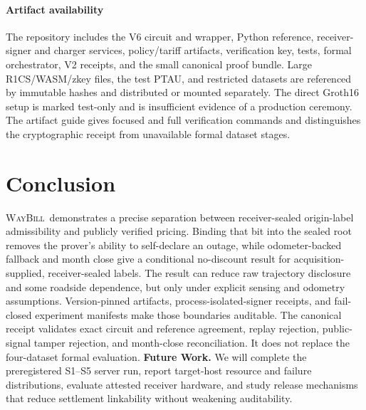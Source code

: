 \documentclass[conference]{IEEEtran}
\theoremstyle{plain}
\theoremstyle{definition}
\newcommand{\system}{\textsc{WayBill}}
\begin{document}
\paragraph{Artifact availability}
The repository includes the V6 circuit and wrapper, Python reference,
receiver-signer and charger services, policy/tariff artifacts, verification
key, tests, formal orchestrator, V2 receipts, and the small canonical proof
bundle. Large R1CS/WASM/zkey files, the test PTAU, and restricted datasets are
referenced by immutable hashes and distributed or mounted separately. The
direct Groth16 setup is marked test-only and is insufficient evidence of a
production ceremony. The artifact guide gives focused and full verification
commands and distinguishes the cryptographic receipt from unavailable formal
dataset stages.

\section{Conclusion}

\system\ demonstrates a precise separation between receiver-sealed
origin-label admissibility and publicly verified pricing. Binding that bit into the sealed root
removes the prover's ability to self-declare an outage, while odometer-backed
fallback and month close give a conditional no-discount result for
acquisition-supplied, receiver-sealed labels. The result can reduce raw trajectory disclosure
and some roadside dependence, but only under explicit sensing and odometry
assumptions. Version-pinned artifacts, process-isolated-signer receipts, and
fail-closed experiment manifests make those boundaries auditable.
The canonical receipt validates exact circuit and reference agreement, replay
rejection, public-signal tamper rejection, and month-close reconciliation. It
does not replace the four-dataset formal evaluation. \textbf{Future Work.} We
will complete the preregistered S1--S5 server run, report target-host resource
and failure distributions, evaluate attested receiver hardware, and study
release mechanisms that reduce settlement linkability without weakening
auditability.



\end{document}
